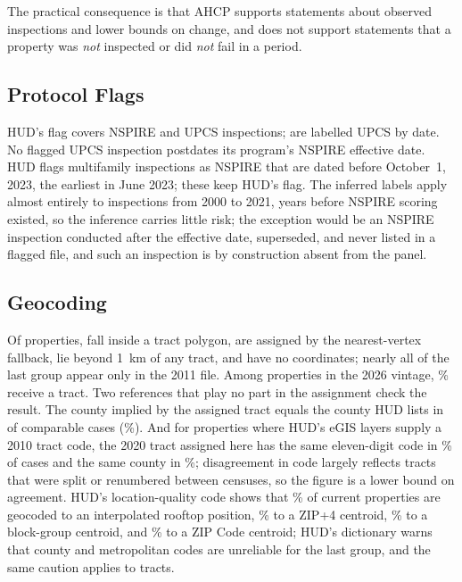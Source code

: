\documentclass[10pt,twocolumn,letterpaper]{article}
\begin{document}
\begin{table}[t]
\caption{Years between consecutive inspections of the same property as observed in AHCP}\label{tab:intervals}
\centering\footnotesize
\resizebox{\columnwidth}{!}{}
\end{table}

The practical consequence is that AHCP supports statements about observed inspections and lower bounds on change, and does not support statements that a property was \emph{not} inspected or did \emph{not} fail in a period.

\subsection{Protocol Flags}
HUD's flag covers \SNspireHudFlag{} NSPIRE and \SUpcsHudFlag{} UPCS inspections; \SUpcsInferred{} are labelled UPCS by date. No flagged UPCS inspection postdates its program's NSPIRE effective date. HUD flags \SNspireMfBeforeStart{} multifamily inspections as NSPIRE that are dated before October~1, 2023, the earliest in June 2023; these keep HUD's flag. The inferred labels apply almost entirely to inspections from 2000 to 2021, years before NSPIRE scoring existed, so the inference carries little risk; the exception would be an NSPIRE inspection conducted after the effective date, superseded, and never listed in a flagged file, and such an inspection is by construction absent from the panel.

\subsection{Geocoding}
Of \SProperties{} properties, \tractContains{} fall inside a tract polygon, \tractNearest{} are assigned by the nearest-vertex fallback, \tractOutside{} lie beyond 1~km of any tract, and \tractNoCoord{} have no coordinates; nearly all of the last group appear only in the 2011 file. Among properties in the 2026 vintage, \curTractPct\% receive a tract. Two references that play no part in the assignment check the result. The county implied by the assigned tract equals the county HUD lists in \tractCountyAgree{} of \tractCountyN{} comparable cases (\STractCountyAgreePct\%). And for \tractHudCompareN{} properties where HUD's eGIS layers supply a 2010 tract code, the 2020 tract assigned here has the same eleven-digit code in \tractHudSameCode\% of cases and the same county in \tractHudSameCounty\%; disagreement in code largely reflects tracts that were split or renumbered between censuses, so the figure is a lower bound on agreement. HUD's location-quality code shows that \lqRooftopPct\% of current properties are geocoded to an interpolated rooftop position, \lqZipFourPct\% to a ZIP+4 centroid, \lqBlockGroupPct\% to a block-group centroid, and \lqZipCentroidPct\% to a ZIP Code centroid; HUD's dictionary warns that county and metropolitan codes are unreliable for the last group, and the same caution applies to tracts.
\end{document}
